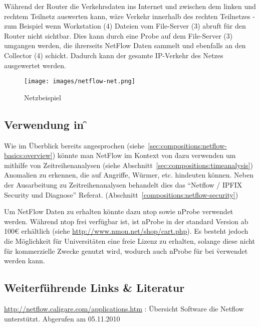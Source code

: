 Während der Router die Verkehrsdaten ins Internet und zwischen dem linken und
rechtem Teilnetz auswerten kann, wäre Verkehr innerhalb des rechten Teilnetzes -
zum Beispiel wenn Workstation (4) Dateien vom File-Server (3) abruft für den
Router nicht sichtbar. Dies kann durch eine Probe auf dem File-Server (3)
umgangen werden, die ihrerseits NetFlow Daten sammelt und ebenfalls an den
Collector (4) schickt. Dadurch kann der gesamte IP-Verkehr des Netzes
ausgewertet werden.

\begin{figure}
  \begin{center}
    \texttt{[image: images/netflow-net.png]}
    \caption{Netzbeispiel}
    \label{fig:compositions:netflow-net}
  \end{center}
\end{figure}

\subsection{Verwendung in \f}

Wie im Überblick bereits angesprochen 
(siehe~\ref{sec:compositions:netflow-basics:overview}) könnte man NetFlow
im Kontext von \f dazu verwenden um mithilfe von Zeitreihenanalysen
(siehe Abschnitt~\ref{sec:compositions:timeanalysis}) Anomalien zu erkennen,
die auf Angriffe, Würmer, etc. hindeuten können. Neben der Ausarbeitung zu
Zeitreihenanalysen behandelt dies das \enquote{Netflow / IPFIX Security und Diagnose}
Referat. (Abschnitt~\ref{compositions:netflow-security})

Um NetFlow Daten zu erhalten könnte dazu ntop sowie nProbe verwendet werden.
Während ntop frei verfügbar ist, ist nProbe in der standard Version ab 100€
erhältlich (siehe \url{http://www.nmon.net/shop/cart.php}). Es besteht jedoch
die Möglichkeit für Universitäten eine freie Lizenz zu erhalten, solange diese
nicht für kommerzielle Zwecke genutzt wird, wodurch auch nProbe für bei \f
verwendet werden kann.

\subsection{Weiterführende Links \& Literatur}

\url{http://netflow.caligare.com/applications.htm} : Übersicht Software die
Netflow unterstützt. Abgerufen am 05.11.2010
